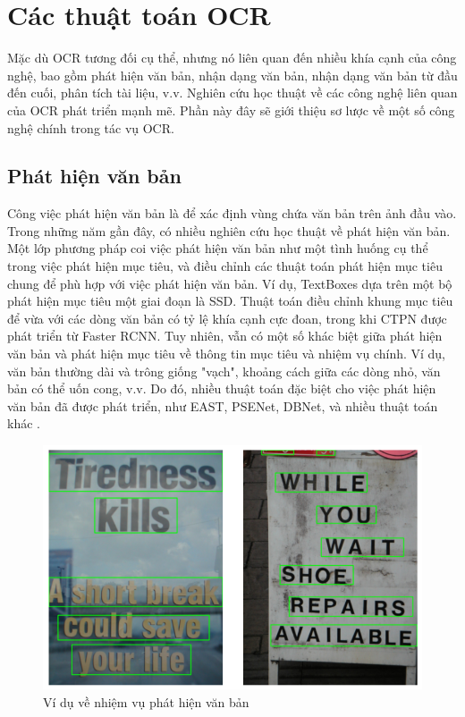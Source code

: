 \section{Các thuật toán OCR}
Mặc dù OCR tương đối cụ thể, nhưng nó liên quan đến nhiều khía cạnh của công nghệ, bao gồm phát hiện văn bản, nhận dạng văn bản, nhận dạng văn bản từ đầu đến cuối, phân tích tài liệu, v.v. Nghiên cứu học thuật về các công nghệ liên quan của OCR phát triển mạnh mẽ. Phần này đây sẽ giới thiệu sơ lược về một số công nghệ chính trong tác vụ OCR.
\subsection{Phát hiện văn bản}
Công việc phát hiện văn bản là để xác định vùng chứa văn bản trên ảnh đầu vào. Trong những năm gần đây, có nhiều nghiên cứu học thuật về phát hiện văn bản. Một lớp phương pháp coi việc phát hiện văn bản như một tình huống cụ thể trong việc phát hiện mục tiêu, và điều chỉnh các thuật toán phát hiện mục tiêu chung để phù hợp với việc phát hiện văn bản. Ví dụ, TextBoxes dựa trên một bộ phát hiện mục tiêu một giai đoạn là SSD. Thuật toán điều chỉnh khung mục tiêu để vừa với các dòng văn bản có tỷ lệ khía cạnh cực đoan, trong khi CTPN được phát triển từ Faster RCNN. Tuy nhiên, vẫn có một số khác biệt giữa phát hiện văn bản và phát hiện mục tiêu về thông tin mục tiêu và nhiệm vụ chính. Ví dụ, văn bản thường dài và trông giống "vạch", khoảng cách giữa các dòng nhỏ, văn bản có thể uốn cong, v.v. Do đó, nhiều thuật toán đặc biệt cho việc phát hiện văn bản đã được phát triển, như EAST, PSENet, DBNet, và nhiều thuật toán khác \cite{Dive-into-ocr-2022}.
\begin{figure}
    \includegraphics[scale=0.7]{chapter2/images/text-detection.png}
    \centering
    \caption{Ví dụ về nhiệm vụ phát hiện văn bản}
\end{figure}

